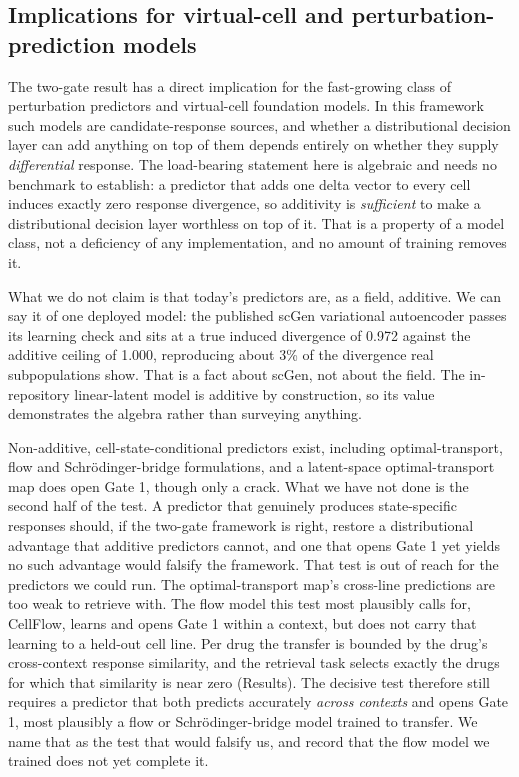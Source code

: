 \documentclass[11pt,letterpaper]{article}
\begin{document}
\subsection*{Implications for virtual-cell and perturbation-prediction models}

The two-gate result has a direct implication for the fast-growing class of perturbation predictors
and virtual-cell foundation models. In this framework such models are
candidate-response sources, and whether a distributional decision layer can add anything
on top of them depends entirely on whether they supply \emph{differential} response. The
load-bearing statement here is algebraic and needs no benchmark to establish: a predictor that
adds one delta vector to every cell induces exactly zero response divergence, so additivity is
\emph{sufficient} to make a distributional decision layer worthless on top of it. That is a
property of a model class, not a deficiency of any implementation, and no amount of training
removes it.

What we do not claim is that today's predictors are, as a field, additive. We can say it of
one deployed model: the published scGen variational autoencoder passes its learning check and sits
at a true induced divergence of 0.972 against the additive ceiling of 1.000, reproducing about 3\%
of the divergence real subpopulations show. That is a fact about scGen, not about the field. The
in-repository linear-latent model is additive by construction, so its value demonstrates the algebra
rather than surveying anything.

Non-additive, cell-state-conditional predictors exist, including optimal-transport, flow and
Schr\"odinger-bridge formulations\cite{CellOT,Departures}, and a latent-space optimal-transport map
does open Gate 1, though only a crack. What we have not done is the second half of the test.
A predictor that genuinely produces state-specific responses should, if the two-gate framework is
right, restore a distributional advantage that additive predictors cannot, and one that opens Gate 1
yet yields no such advantage would falsify the framework. That test is out of reach for the
predictors we could run. The optimal-transport map's cross-line predictions are too weak to retrieve
with. The flow model this test most plausibly calls for, CellFlow\cite{CellFlow}, learns and opens
Gate 1 within a context, but does not carry that learning to a held-out cell line. Per drug the
transfer is bounded by the drug's cross-context response similarity, and the retrieval task selects
exactly the drugs for which that similarity is near zero (Results). The decisive test
therefore still requires a predictor that both predicts accurately \emph{across contexts} and opens
Gate 1, most plausibly a flow or Schr\"odinger-bridge model trained to transfer. We name that as
the test that would falsify us, and record that the flow model we trained does not yet complete it.
\end{document}

